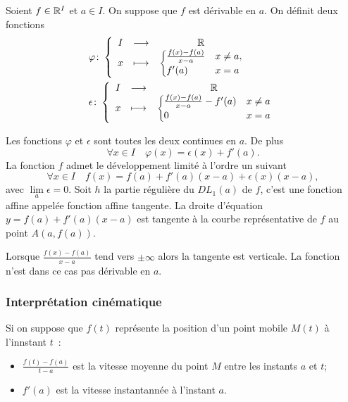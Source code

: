 Soient \(f \in \mathbb{R}^I\) et \(a \in I\). On suppose que \(f\) est dérivable en \(a\). On définit deux fonctions
\begin{align}
  &\varphi\colon \left\{\begin{array}{ccc} I & \longrightarrow &\mathbb{R}\\ x & \longmapsto & \begin{cases}\frac{f(x)-f(a)}{x-a} & x \neq a, \\ f'(a) & x=a\end{cases} \end{array} \right. \\ 
  &\epsilon\colon \left\{\begin{array}{ccc} I & \longrightarrow &\mathbb{R}\\ x & \longmapsto & \begin{cases}\frac{f(x)-f(a)}{x-a} -f'(a)& x \neq a \\ 0 & x=a\end{cases} \end{array} \right.
\end{align}
%
\begin{prop}
  Les fonctions \(\varphi\) et \(\epsilon\) sont toutes les deux continues en \(a\). De plus
  \begin{equation}
    \forall x \in I \quad \varphi(x) = \epsilon(x) +f'(a).
  \end{equation}
  La fonction \(f\) admet le développement limité à l'ordre un suivant
  \begin{equation}
    \forall x \in I \quad f(x) = f(a) + f'(a)(x-a) + \epsilon(x)(x-a),
  \end{equation}
  avec \(\lim\limits_{a} \epsilon=0\). Soit \(h\) la partie régulière du \(DL_1(a)\) de \(f\), c'est une fonction affine appelée fonction affine tangente. La droite d'équation \(y=f(a)+f'(a)(x-a)\) est tangente à la courbe représentative de \(f\) au point \(A(a,f(a))\).
\end{prop}
%
Lorsque \(\frac{f(x)-f(a)}{x-a}\) tend vers \(\pm\infty\) alors la tangente est verticale. La fonction n'est dans ce cas pas dérivable en \(a\).

\subsubsection{Interprétation cinématique}
Si on suppose que \(f(t)\) représente la position d'un point mobile \(M(t)\) à l'innstant \(t\)~:
\begin{itemize}
\item \(\frac{f(t)-f(a)}{t-a}\) est la vitesse moyenne du point \(M\) entre les instants \(a\) et \(t\);
\item \(f'(a)\) est la vitesse instantannée à l'instant \(a\).
\end{itemize}

